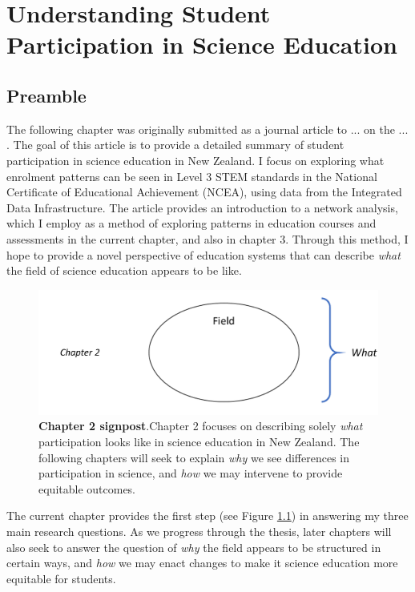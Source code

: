 \chapter{Understanding Student Participation in Science Education}

\section{Preamble}
The following chapter was originally submitted as a journal article to ... on the ... . The goal of this article is to provide a detailed summary of student participation in science education in New Zealand. I focus on exploring what enrolment patterns can be seen in Level 3 STEM standards in the National Certificate of Educational Achievement (NCEA), using data from the Integrated Data Infrastructure. The article provides an introduction to a network analysis, which I employ as a method of exploring patterns in education courses and assessments in the current chapter, and also in chapter 3. Through this method, I hope to provide a novel perspective of education systems that can describe \textit{what} the field of science education appears to be like. 

\begin{figure}[h]
    \centering
    \includegraphics[width = \textwidth]{C2 - Student Pathways/Thesis_structure_guide_chapter2.pdf}
    \caption{\textbf{Chapter 2 signpost}.Chapter 2 focuses on describing solely \textit{what} participation looks like in science education in New Zealand. The following chapters will seek to explain \textit{why} we see differences in participation in science, and \textit{how} we may intervene to provide equitable outcomes.
    }
    
    \label{fig:Thesis_structure_c2}
\end{figure}
The current chapter provides the first step (see Figure \ref{fig:Thesis_structure_c2}) in answering my three main research questions. As we progress through the thesis, later chapters will also seek to answer the question of \textit{why} the field appears to be structured in certain ways, and \textit{how} we may enact changes to make it science education more equitable for students.


